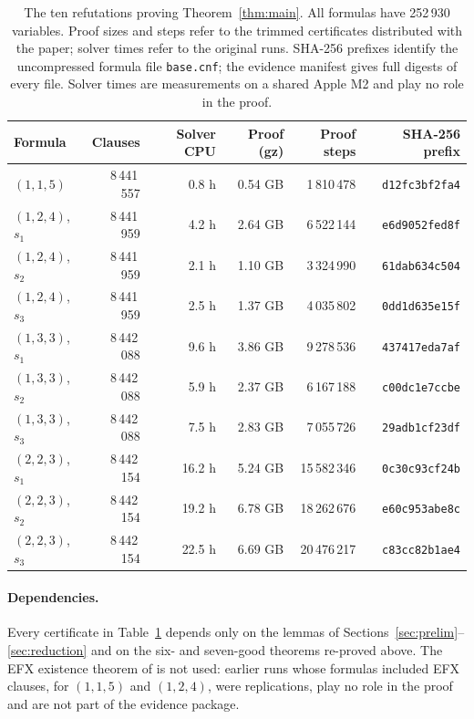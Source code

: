 \documentclass[11pt,a4paper]{article}
\theoremstyle{remark}
\begin{document}
\begin{table}[H]
\centering\small
\begin{tabular}{@{}lrrrrr@{}}
\toprule
Formula & Clauses & Solver CPU & Proof (gz) & Proof steps & SHA-256 prefix \\
\midrule
$(1,1,5)$ & 8\,441\,557 & 0.8 h & 0.54 GB & 1\,810\,478 & \texttt{d12fc3bf2fa4} \\
$(1,2,4)$, $s_1$ & 8\,441\,959 & 4.2 h & 2.64 GB & 6\,522\,144 & \texttt{e6d9052fed8f} \\
$(1,2,4)$, $s_2$ & 8\,441\,959 & 2.1 h & 1.10 GB & 3\,324\,990 & \texttt{61dab634c504} \\
$(1,2,4)$, $s_3$ & 8\,441\,959 & 2.5 h & 1.37 GB & 4\,035\,802 & \texttt{0dd1d635e15f} \\
$(1,3,3)$, $s_1$ & 8\,442\,088 & 9.6 h & 3.86 GB & 9\,278\,536 & \texttt{437417eda7af} \\
$(1,3,3)$, $s_2$ & 8\,442\,088 & 5.9 h & 2.37 GB & 6\,167\,188 & \texttt{c00dc1e7ccbe} \\
$(1,3,3)$, $s_3$ & 8\,442\,088 & 7.5 h & 2.83 GB & 7\,055\,726 & \texttt{29adb1cf23df} \\
$(2,2,3)$, $s_1$ & 8\,442\,154 & 16.2 h & 5.24 GB & 15\,582\,346 & \texttt{0c30c93cf24b} \\
$(2,2,3)$, $s_2$ & 8\,442\,154 & 19.2 h & 6.78 GB & 18\,262\,676 & \texttt{e60c953abe8c} \\
$(2,2,3)$, $s_3$ & 8\,442\,154 & 22.5 h & 6.69 GB & 20\,476\,217 & \texttt{c83cc82b1ae4} \\
\bottomrule
\end{tabular}
\caption{The ten refutations proving Theorem~\ref{thm:main}. All formulas have 252\,930 variables. Proof sizes and steps refer to the trimmed certificates distributed with the paper; solver times refer to the original runs. SHA-256 prefixes identify the uncompressed formula file \texttt{base.cnf}; the evidence manifest gives full digests of every file. Solver times are measurements on a shared Apple M2 and play no role in the proof.}
\label{tab:cert}
\end{table}

\paragraph{Dependencies.} Every certificate in Table~\ref{tab:cert} depends only on the lemmas of Sections~\ref{sec:prelim}--\ref{sec:reduction} and on the six- and seven-good theorems re-proved above. The EFX existence theorem of \cite{CGM24} is not used: earlier runs whose formulas included EFX clauses, for $(1,1,5)$ and $(1,2,4)$, were replications, play no role in the proof and are not part of the evidence package.
\end{document}
